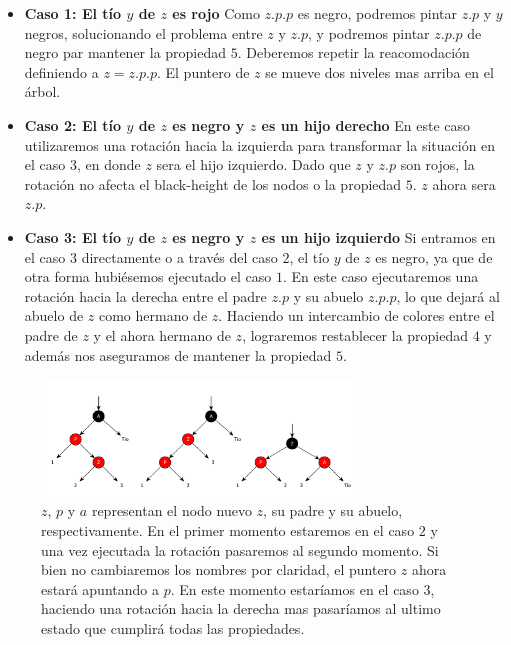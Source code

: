 \begin{itemize}
 \item \textbf{Caso 1: El t\'io $y$ de $z$ es rojo} Como $z.p.p$ es negro, podremos pintar $z.p$ y $y$ negros, solucionando el problema entre $z$ y $z.p$, y podremos pintar $z.p.p$ de negro par mantener la propiedad $5$. Deberemos repetir la reacomodaci\'on definiendo a $z = z.p.p$. El puntero de $z$ se mueve dos niveles mas arriba en el \'arbol.
 \item \textbf{Caso 2: El t\'io $y$ de $z$ es negro y $z$ es un hijo derecho} En este caso utilizaremos una rotaci\'on hacia la izquierda para transformar la situaci\'on en el caso $3$, en donde $z$ sera el hijo izquierdo. Dado que $z$ y $z.p$ son rojos, la rotaci\'on no afecta el black-height de los nodos o la propiedad $5$. $z$ ahora sera $z.p$.
 \item \textbf{Caso 3: El t\'io $y$ de $z$ es negro y $z$ es un hijo izquierdo} Si entramos en el caso $3$ directamente o a trav\'es del caso $2$, el t\'io $y$ de $z$ es negro, ya que de otra forma hubi\'esemos ejecutado el caso $1$. En este caso ejecutaremos una rotaci\'on hacia la derecha entre el padre $z.p$ y su abuelo $z.p.p$, lo que dejar\'a al abuelo de $z$ como hermano de $z$. Haciendo un intercambio de colores entre el padre de $z$ y el ahora hermano de $z$, lograremos restablecer la propiedad $4$ y adem\'as nos aseguramos de mantener la propiedad $5$.
 \end{itemize}

\begin{figure}
 \centering
 \includegraphics[width=0.75\textwidth]{graficos/RBCaso3.pdf}
 \caption*{\newline \footnotesize $z$, $p$ y $a$ representan el nodo nuevo $z$, su padre y su abuelo, respectivamente. En el primer momento estaremos en el caso $2$ y una vez ejecutada la rotaci\'on pasaremos al segundo momento. Si bien no cambiaremos los nombres por claridad, el puntero $z$ ahora estar\'a apuntando a $p$. En este momento estar\'iamos en el caso $3$, haciendo una rotaci\'on hacia la derecha mas pasar\'iamos al ultimo estado que cumplir\'a todas las propiedades.}
\end{figure}
 
